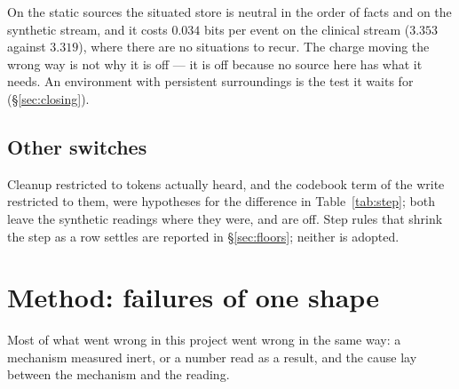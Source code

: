 \documentclass[11pt,a4paper]{article}
\theoremstyle{plain}
\theoremstyle{definition}
\theoremstyle{remark}
\begin{document}
On the static sources the situated store is neutral in the order of facts and
on the synthetic stream, and it costs $0.034$ bits per event on the clinical
stream ($3.353$ against $3.319$), where there are no situations to recur. The
charge moving the wrong way is not why it is off --- it is off because no source
here has what it needs. An environment with persistent surroundings is the
test it waits for (\S\ref{sec:closing}).

\subsection{Other switches}

Cleanup restricted to tokens actually heard, and the codebook term of the
write restricted to them, were hypotheses for the difference in
Table~\ref{tab:step}; both leave the synthetic readings where they were, and are
off. Step rules that shrink the step as a row settles are reported in
\S\ref{sec:floors}; neither is adopted.

\section{Method: failures of one shape}
\label{sec:lessons}

Most of what went wrong in this project went wrong in the same way: a mechanism
measured inert, or a number read as a result, and the cause lay between the
mechanism and the reading.
\end{document}
